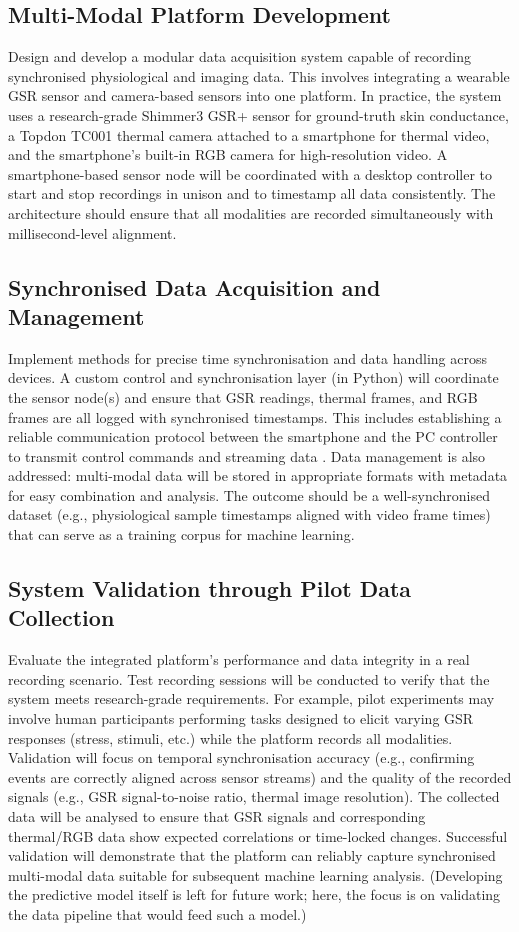 \subsection{Multi-Modal Platform Development} Design and develop a modular data acquisition system capable of recording synchronised physiological and imaging data. This involves integrating a wearable GSR sensor and camera-based sensors into one platform. In practice, the system uses a research-grade Shimmer3 GSR+ sensor \cite{ref8} for ground-truth skin conductance, a Topdon TC001 thermal camera \cite{ref20} attached to a smartphone for thermal video, and the smartphone's built-in RGB camera for high-resolution video. A smartphone-based sensor node will be coordinated with a desktop controller to start and stop recordings in unison and to timestamp all data consistently. The architecture should ensure that all modalities are recorded simultaneously with millisecond-level alignment.

\subsection{Synchronised Data Acquisition and Management} Implement methods for precise time synchronisation and data handling across devices. A custom control and synchronisation layer (in Python) will coordinate the sensor node(s) and ensure that GSR readings, thermal frames, and RGB frames are all logged with synchronised timestamps. This includes establishing a reliable communication protocol between the smartphone and the PC controller to transmit control commands and streaming data \cite{ref9}. Data management is also addressed: multi-modal data will be stored in appropriate formats with metadata for easy combination and analysis. The outcome should be a well-synchronised dataset (e.g., physiological sample timestamps aligned with video frame times) that can serve as a training corpus for machine learning.

\subsection{System Validation through Pilot Data Collection} Evaluate the integrated platform's performance and data integrity in a real recording scenario. Test recording sessions will be conducted to verify that the system meets research-grade requirements. For example, pilot experiments may involve human participants performing tasks designed to elicit varying GSR responses (stress, stimuli, etc.) while the platform records all modalities. Validation will focus on temporal synchronisation accuracy (e.g., confirming events are correctly aligned across sensor streams) and the quality of the recorded signals (e.g., GSR signal-to-noise ratio, thermal image resolution). The collected data will be analysed to ensure that GSR signals and corresponding thermal/RGB data show expected correlations or time-locked changes. Successful validation will demonstrate that the platform can reliably capture synchronised multi-modal data suitable for subsequent machine learning analysis. (Developing the predictive model itself is left for future work; here, the focus is on validating the data pipeline that would feed such a model.)

